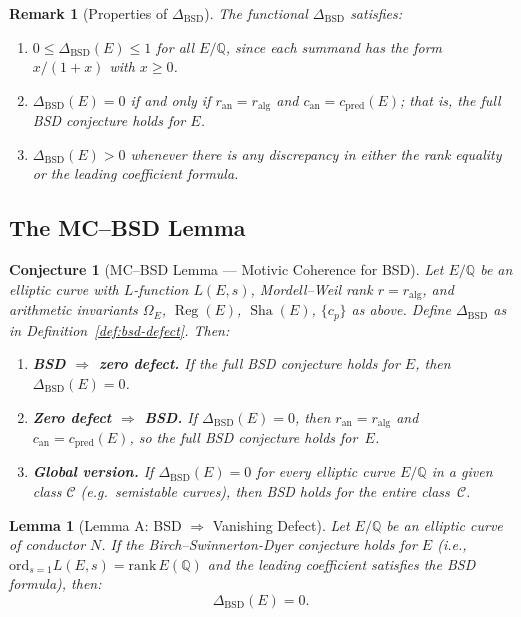 \documentclass[11pt]{article}
\newtheorem{lemma}[theorem]{Lemma}
\newtheorem{remark}[theorem]{Remark}
\newtheorem{conjecture}[theorem]{Conjecture}
\DeclareMathOperator{\Reg}{Reg}
\DeclareMathOperator{\Sha}{Sha}
\begin{document}
\begin{remark}[Properties of $\Delta_{\mathrm{BSD}}$]
\label{rem:delta-props}
The functional $\Delta_{\mathrm{BSD}}$ satisfies:
\begin{enumerate}
\item $0 \le \Delta_{\mathrm{BSD}}(E) \le 1$ for all $E/\mathbb{Q}$, since each
  summand has the form $x/(1+x)$ with $x \ge 0$.
\item $\Delta_{\mathrm{BSD}}(E) = 0$ if and only if $r_{\mathrm{an}} =
  r_{\mathrm{alg}}$ and $c_{\mathrm{an}} = c_{\mathrm{pred}}(E)$; that is,
  the full BSD conjecture holds for $E$.
\item $\Delta_{\mathrm{BSD}}(E) > 0$ whenever there is any discrepancy in
  either the rank equality or the leading coefficient formula.
\end{enumerate}
\end{remark}

\subsection{The MC--BSD Lemma}

\begin{conjecture}[MC--BSD Lemma --- Motivic Coherence for BSD]
\label{conj:mc-bsd}
Let $E/\mathbb{Q}$ be an elliptic curve with $L$-function $L(E,s)$,
Mordell--Weil rank $r = r_{\mathrm{alg}}$, and arithmetic invariants
$\Omega_E$, $\Reg(E)$, $\Sha(E)$, $\{c_p\}$ as above.  Define
$\Delta_{\mathrm{BSD}}$ as in Definition~\ref{def:bsd-defect}.  Then:
\begin{enumerate}
\item \textbf{BSD $\Rightarrow$ zero defect.}\quad
  If the full BSD conjecture holds for $E$, then $\Delta_{\mathrm{BSD}}(E) = 0$.
\item \textbf{Zero defect $\Rightarrow$ BSD.}\quad
  If $\Delta_{\mathrm{BSD}}(E) = 0$, then $r_{\mathrm{an}} = r_{\mathrm{alg}}$
  and $c_{\mathrm{an}} = c_{\mathrm{pred}}(E)$, so the full BSD conjecture
  holds for~$E$.
\item \textbf{Global version.}\quad
  If $\Delta_{\mathrm{BSD}}(E) = 0$ for every elliptic curve $E/\mathbb{Q}$
  in a given class $\mathcal{C}$ (e.g.\ semistable curves), then BSD holds
  for the entire class~$\mathcal{C}$.
\end{enumerate}
\end{conjecture}

\begin{lemma}[Lemma A: BSD $\Rightarrow$ Vanishing Defect]
\label{lem:bsd-A}
Let $E/\mathbb{Q}$ be an elliptic curve of conductor $N$. If the Birch--Swinnerton-Dyer conjecture holds for $E$ (i.e., $\mathrm{ord}_{s=1} L(E,s) = \mathrm{rank}\, E(\mathbb{Q})$ and the leading coefficient satisfies the BSD formula), then:
\[
  \Delta_{\mathrm{BSD}}(E) = 0.
\]
\end{lemma}
\end{document}
